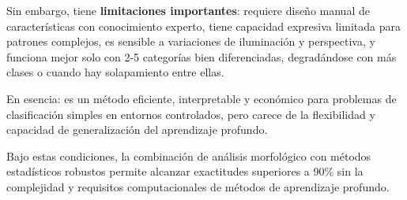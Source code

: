 Sin embargo, tiene \textbf{limitaciones importantes}: requiere diseño manual de características con conocimiento experto, tiene capacidad expresiva limitada para patrones complejos, es sensible a variaciones de iluminación y perspectiva, y funciona mejor solo con 2-5 categorías bien diferenciadas, degradándose con más clases o cuando hay solapamiento entre ellas.

En esencia: es un método eficiente, interpretable y económico para problemas de clasificación simples en entornos controlados, pero carece de la flexibilidad y capacidad de generalización del aprendizaje profundo.

Bajo estas condiciones, la combinación de análisis morfológico con métodos estadísticos robustos permite alcanzar exactitudes superiores a 90\% sin la complejidad y requisitos computacionales de métodos de aprendizaje profundo.
